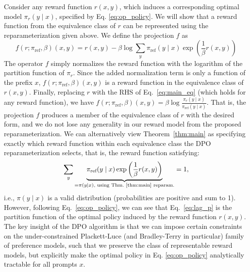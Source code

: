 \documentclass{article}
\newenvironment{sproof}{
  \renewcommand{\proofname}{Proof Sketch}\proof}{\endproof}
\newcommand{\piref}{\pi_\text{ref}}
\begin{document}
\begin{sproof}
    Consider any reward function $r(x, y)$, which induces a corresponding optimal model $\pi_r(y \mid x)$, specified by Eq. \ref{eq:op_policy}. We will show that a reward function from the equivalence class of $r$ can be represented using the reparameterization given above. We define the projection $f$ as  
\begin{equation}
    f(r; \piref, \beta)(x, y) = r(x, y) - \beta\log\sum_{y}\piref(y\mid x)\exp\left(\frac{1}{\beta}r(x, y)\right)
\end{equation}
The operator $f$ simply normalizes the reward function with the logarithm of the partition function of $\pi_r$. Since the added normalization term is only a function of the prefix $x$, $f(r; \piref, \beta)(x, y) $ is a reward function in the equivalence class of $r(x, y)$. Finally, replacing $r$ with the RHS of Eq.~\ref{eq:main_eq} (which holds for any reward function), we have $f(r; \piref, \beta)(x, y) = \beta \log \frac{\pi_r(y\mid x)}{\piref(y\mid x)}$. That is, the projection $f$ produces a member of the equivalence class of $r$ with the desired form, and we do not lose any generality in our reward model from the proposed reparameterization.
\end{sproof}
We can alternatively view Theorem~\ref{thm:main} as specifying exactly which reward function within each equivalence class the DPO reparameterization selects, that is, the reward function satisfying:
\begin{equation}\label{eq:lag_p}
     \sum_{y}\underbrace{\piref(y\mid x)\exp\left(\frac{1}{\beta}r(x, y)\right)}_{=\pi(y\mid x)\text{, using Thm.~\ref{thm:main} reparam.}} = 1,
\end{equation}
i.e., $\pi(y\mid x)$ is a valid distribution (probabilities are positive and sum to 1).
However, following Eq.~\ref{eq:op_policy}, we can see that Eq.~\ref{eq:lag_p} is the partition function of the optimal policy induced by the reward function $r(x, y)$.
The key insight of the DPO algorithm is that we can impose certain constraints on the under-constrained Plackett-Luce (and Bradley-Terry in particular) family of preference models, such that we preserve the class of representable reward models, but explicitly make the optimal policy in Eq. \ref{eq:op_policy} analytically tractable for all prompts $x$.
\end{document}
